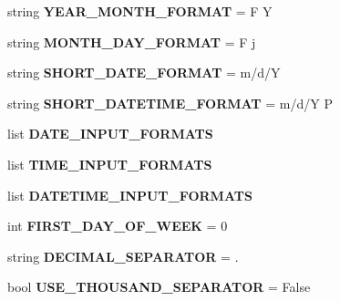 \begin{DoxyCompactItemize}
string {\bfseries Y\+E\+A\+R\+\_\+\+M\+O\+N\+T\+H\+\_\+\+F\+O\+R\+M\+AT} = \textquotesingle{}F Y\textquotesingle{}
\item 
\mbox{\label{namespacedjango_1_1conf_1_1global__settings_a4af4c4b44af3dfe2a532bb85e6a276c8}} 
string {\bfseries M\+O\+N\+T\+H\+\_\+\+D\+A\+Y\+\_\+\+F\+O\+R\+M\+AT} = \textquotesingle{}F j\textquotesingle{}
\item 
\mbox{\label{namespacedjango_1_1conf_1_1global__settings_ace76fe42381801b2b1829386adf69aa6}} 
string {\bfseries S\+H\+O\+R\+T\+\_\+\+D\+A\+T\+E\+\_\+\+F\+O\+R\+M\+AT} = \textquotesingle{}m/d/Y\textquotesingle{}
\item 
\mbox{\label{namespacedjango_1_1conf_1_1global__settings_acde7a23db197a3149cbfb23b28e27310}} 
string {\bfseries S\+H\+O\+R\+T\+\_\+\+D\+A\+T\+E\+T\+I\+M\+E\+\_\+\+F\+O\+R\+M\+AT} = \textquotesingle{}m/d/Y P\textquotesingle{}
\item 
list {\bfseries D\+A\+T\+E\+\_\+\+I\+N\+P\+U\+T\+\_\+\+F\+O\+R\+M\+A\+TS}
\item 
list {\bfseries T\+I\+M\+E\+\_\+\+I\+N\+P\+U\+T\+\_\+\+F\+O\+R\+M\+A\+TS}
\item 
list {\bfseries D\+A\+T\+E\+T\+I\+M\+E\+\_\+\+I\+N\+P\+U\+T\+\_\+\+F\+O\+R\+M\+A\+TS}
\item 
\mbox{\label{namespacedjango_1_1conf_1_1global__settings_a0a0433e3d9475122ed7c97536c0307da}} 
int {\bfseries F\+I\+R\+S\+T\+\_\+\+D\+A\+Y\+\_\+\+O\+F\+\_\+\+W\+E\+EK} = 0
\item 
\mbox{\label{namespacedjango_1_1conf_1_1global__settings_a2f54ce5f2af236d5a868520b23b6f1a8}} 
string {\bfseries D\+E\+C\+I\+M\+A\+L\+\_\+\+S\+E\+P\+A\+R\+A\+T\+OR} = \textquotesingle{}.\textquotesingle{}
\item 
\mbox{\label{namespacedjango_1_1conf_1_1global__settings_ac4d9e6fae3c17c0620b6bb4b22c61fbe}} 
bool {\bfseries U\+S\+E\+\_\+\+T\+H\+O\+U\+S\+A\+N\+D\+\_\+\+S\+E\+P\+A\+R\+A\+T\+OR} = False
\item 
\mbox{\label{namespacedjango_1_1conf_1_1global__settings_ac7295461496e8c5f1ad67eb7613a72de}} 

\end{DoxyCompactItemize}
